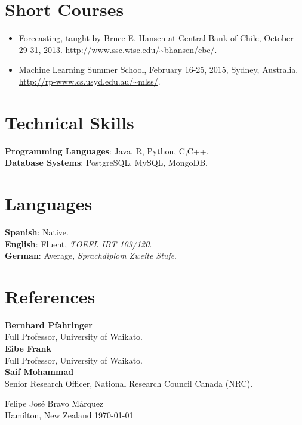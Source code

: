 \documentclass[letterpaper]{article}
\begin{document}
  
  
\section{Short Courses}
\begin{itemize}
 \item Forecasting, taught by Bruce E. Hansen at Central Bank of Chile, October 29-31, 2013. \url{http://www.ssc.wisc.edu/~bhansen/cbc/}.
 \item Machine Learning Summer School, February 16-25, 2015, Sydney, Australia. \url{http://rp-www.cs.usyd.edu.au/~mlss/}.
 \end{itemize} 
 
 
 
 
 

\section{Technical Skills}
\begin{flushleft}
\textbf{Programming Languages}: Java, R, Python, C,C++. \\
\textbf{Database Systems}: PostgreSQL, MySQL, MongoDB.\\
\end{flushleft}

\section{Languages}
\begin{flushleft}
\textbf{Spanish}: Native.  \\
\textbf{English}: Fluent, \textit{TOEFL IBT 103/120}.   \\
\textbf{German}:  Average, \textit{Sprachdiplom Zweite Stufe}. \\ 
\end{flushleft}

\section{References}
\begin{flushleft}
\textbf{Bernhard Pfahringer} \\
Full Professor, University of Waikato. \\
\textbf{Eibe Frank} \\
Full Professor, University of Waikato. \\
\textbf{Saif Mohammad}   \\
Senior Research Officer, National Research Council Canada (NRC). \\ 
\end{flushleft}


\vspace{\baselineskip}
\begin{flushright}
Felipe José Bravo Márquez\\
Hamilton, New Zealand \today
\end{flushright}
\end{document}
